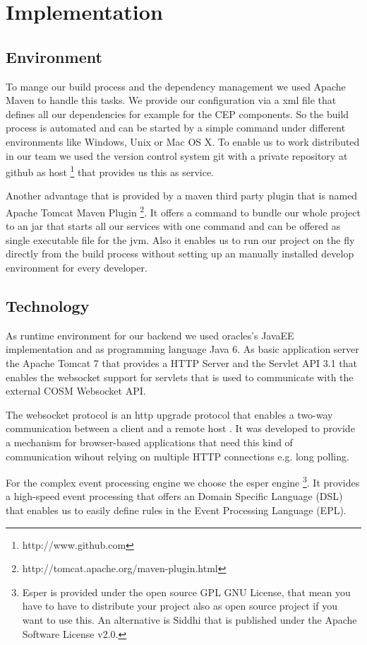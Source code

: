 \documentclass{acm_proc_article-sp}
\begin{document}
\section{Implementation}
\label{sec:Implementation}

\subsection{Environment}
To mange our build process and the dependency management we used Apache Maven to handle this tasks. We provide our configuration via a xml file that defines all our  dependencies for example for the CEP components.
So the build process is automated and can be started by a simple command under different environments like Windows, Unix or Mac OS X.
To enable us to work distributed in our team we used the version control system git with a private repository at github as host
\footnote{http://www.github.com}
that provides us this as service.

Another advantage that is provided by a maven third party plugin that is named Apache Tomcat Maven Plugin
\footnote{http://tomcat.apache.org/maven-plugin.html}.
It offers a command to bundle our whole project to an jar that starts all our services with one command and can be offered as single executable file for the jvm.
Also it enables us to run our project on the fly directly from the build process without setting up an manually installed develop environment for every developer.

\subsection{Technology}
As runtime environment for our backend we used oracles's JavaEE\cite{java6} implementation and as programming language Java 6. As basic application server the Apache Tomcat 7 \cite{tomcat} that provides a HTTP Server and the Servlet API 3.1\cite{servlet31} that enables the websocket support for servlets that is used to communicate with the external COSM Websocket API\cite{cosm}.

The websocket protocol is an http upgrade protocol that enables a two-way communication between a client and a remote host \cite{websocket}. It was developed to provide a mechanism for browser-based applications that need this kind of communication wihout relying on multiple HTTP connections e.g. long polling\cite{long_polling}. 

For the complex event processing engine we choose the esper engine\cite{esper}
\footnote{Esper is provided under the open source GPL GNU License, that mean you have to have to distribute your project also as open source project if you want to use this. An alternative is Siddhi\cite{siddhi} that is published under the Apache Software License v2.0.}.
It provides a high-speed event processing that offers an Domain Specific Language (DSL) that enables us to easily define rules in the Event Processing Language (EPL).
\end{document}
